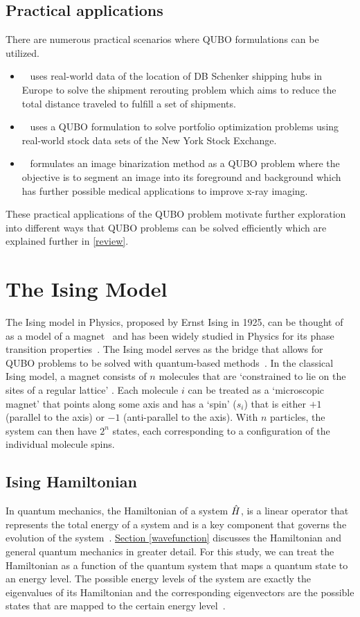 \subsection{Practical applications}
There are numerous practical scenarios where QUBO formulations can be utilized. 
\begin{itemize}
    \item~\cite{b7} uses real-world data of the location of DB Schenker shipping hubs in Europe to solve the shipment rerouting problem which aims to reduce the total distance traveled to fulfill a set of shipments.
    \item~\cite{b8} uses a QUBO formulation to solve portfolio optimization problems using real-world stock data sets of the New York Stock Exchange.
    \item~\cite{b9} formulates an image binarization method as a QUBO problem where the objective is to segment an image into its foreground and background which has further possible medical applications to improve x-ray imaging.
\end{itemize}
These practical applications of the QUBO problem motivate further exploration into different ways that QUBO problems can be solved efficiently which are explained further in \autoref{review}.

\section{The Ising Model}
The Ising model in Physics, proposed by Ernst Ising in 1925, can be thought of as a model of a magnet~\cite{isingising} and has been widely studied in Physics for its phase transition properties~\cite{cipra1987introduction}. The Ising model serves as the bridge that allows for QUBO problems to be solved with quantum-based methods~\cite{b10}. In the classical Ising model, a magnet consists of $n$ molecules that are `constrained to lie on the sites of a regular lattice' \cite{b11}. Each molecule $i$ can be treated as a `microscopic magnet' that points along some axis and has a `spin' ($s_i$) that is either $+1$ (parallel to the axis) or $-1$ (anti-parallel to the axis). With $n$ particles, the system can then have $2^n$ states, each corresponding to a configuration of the individual molecule spins.


\subsection{Ising Hamiltonian}\label{isinghamiltonian}
In quantum mechanics, the Hamiltonian of a system $\Hat{H}$, is a linear operator that represents the total energy of a system and is a key component that governs the evolution of the system~\cite{GriffithsSchroeter2018}. \hyperref[wavefunction]{Section \ref{wavefunction}} discusses the Hamiltonian and general quantum mechanics in greater detail. For this study, we can treat the Hamiltonian as a function of the quantum system that maps a quantum state to an energy level. The possible energy levels of the system are exactly the eigenvalues of its Hamiltonian and the corresponding eigenvectors are the possible states that are mapped to the certain energy level~\cite{b21}. 


